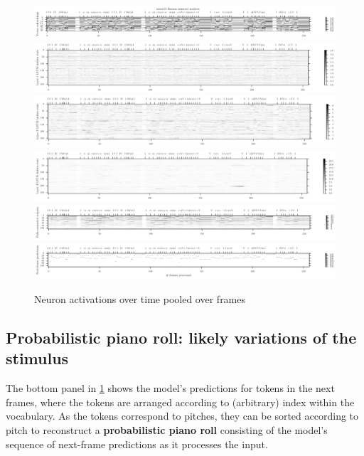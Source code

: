 \begin{figure}[tb]
    \centering
    \includegraphics[width=1.0\linewidth]{model-analysis-chords-0.pdf}
    \includegraphics[width=1.0\linewidth]{model-analysis-chords-1.pdf}
    \includegraphics[width=1.0\linewidth]{model-analysis-chords-2.pdf}
    \includegraphics[width=1.0\linewidth]{model-analysis-chords-3.pdf}
    \includegraphics[width=1.0\linewidth]{model-analysis-chords-4.pdf}
    \includegraphics[width=1.0\linewidth]{model-analysis-chords-5.pdf}
    \caption{Neuron activations over time pooled over frames}
    \label{fig:model-analysis-frames}
\end{figure}

\subsection{Probabilistic piano roll: likely variations of the stimulus}

The bottom panel in \cref{fig:model-analysis-frames} shows the model's predictions
for tokens in the next frames, where the tokens are arranged according to (arbitrary)
index within the vocabulary. As the tokens correspond to pitches, they can be sorted
according to pitch to reconstruct a {\bf probabilistic piano roll}\citep{eck2008learning}
consisting of the model's sequence of next-frame predictions as it processes the input.

